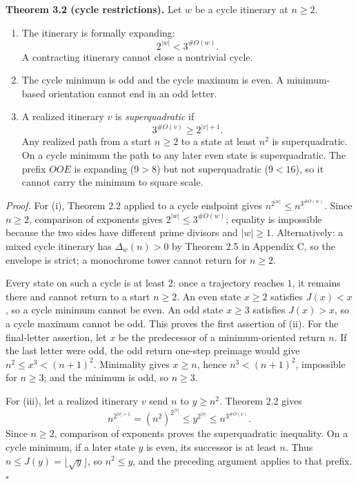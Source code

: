 \documentclass[12pt]{article}
\begin{document}
\textbf{Theorem 3.2 (cycle restrictions).} Let \(w\) be a cycle
itinerary at \(n\ge2\).

\begin{enumerate}
\def\labelenumi{(\roman{enumi})}
\item
  The itinerary is formally expanding: \[
  2^{|w|}<3^{\#O(w)}.
  \] A contracting itinerary cannot close a nontrivial cycle.
\item
  The cycle minimum is odd and the cycle maximum is even. A
  minimum-based orientation cannot end in an odd letter.
\item
  A realized itinerary \(v\) is \emph{superquadratic} if \[
  3^{\#O(v)}\ge 2^{|v|+1}.
  \] Any realized path from a start \(n\ge2\) to a state at least
  \(n^2\) is superquadratic. On a cycle minimum the path to any later
  even state is superquadratic. The prefix \(OOE\) is expanding
  (\(9>8\)) but not superquadratic (\(9<16\)), so it cannot carry the
  minimum to square scale.
\end{enumerate}

\emph{Proof.} For (i), Theorem 2.2 applied to a cycle endpoint gives
\(n^{2^{|w|}}\le n^{3^{\#O(w)}}\). Since \(n\ge2\), comparison of
exponents gives \(2^{|w|}\le 3^{\#O(w)}\); equality is impossible
because the two sides have different prime divisors and \(|w|\ge 1\).
Alternatively: a mixed cycle itinerary has \(\Delta_w(n)>0\) by Theorem
2.5 in Appendix C, so the envelope is strict; a monochrome tower cannot
return for \(n\ge 2\).

Every state on such a cycle is at least \(2\): once a trajectory reaches
\(1\), it remains there and cannot return to a start \(n\ge 2\). An even
state \(x\ge 2\) satisfies \(J(x)<x\), so a cycle minimum cannot be
even. An odd state \(x\ge 3\) satisfies \(J(x)>x\), so a cycle maximum
cannot be odd. This proves the first assertion of (ii). For the
final-letter assertion, let \(x\) be the predecessor of a
minimum-oriented return \(n\). If the last letter were odd, the odd
return one-step preimage would give \(n^2\le x^3<(n+1)^2\). Minimality
gives \(x\ge n\), hence \(n^3<(n+1)^2\), impossible for \(n\ge 3\); and
the minimum is odd, so \(n\ge 3\).

For (iii), let a realized itinerary \(v\) send \(n\) to \(y\ge n^2\).
Theorem 2.2 gives \[
n^{2^{|v|+1}}=(n^2)^{2^{|v|}}
\le y^{2^{|v|}}\le n^{3^{\#O(v)}}.
\] Since \(n\ge 2\), comparison of exponents proves the superquadratic
inequality. On a cycle minimum, if a later state \(y\) is even, its
successor is at least \(n\). Thus \(n\le J(y)=\lfloor\sqrt y\rfloor\),
so \(n^2\le y\), and the preceding argument applies to that prefix.
\(\square\)
\end{document}
